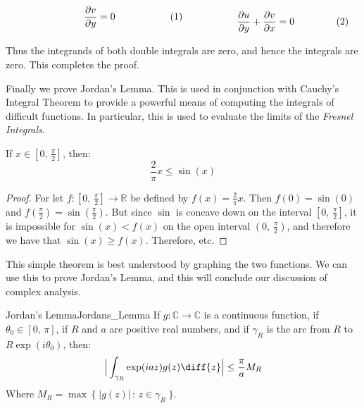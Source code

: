 \begin{bproof}
\begin{subequations}
\begin{minipage}{0.49\textwidth}
\begin{equation}
                    \frac{\partial{v}}{\partial{y}}=0
                \end{equation}
            \end{minipage}
            \hfill
            \begin{minipage}{0.49\textwidth}
                \centering
                \begin{equation}
                    \frac{\partial{u}}{\partial{y}}+
                    \frac{\partial{v}}{\partial{x}}=0
                \end{equation}
            \end{minipage}
        \end{subequations}
        \par\hfill\par
        Thus the integrands of both double integrals are zero,
        and hence the integrals are zero. This completes the proof.
    \end{bproof}
    Finally we prove Jordan's Lemma. This is used
    in conjunction with Cauchy's Integral Theorem to
    provide a powerful means of computing the integrals
    of difficult functions. In particular, this is used
    to evaluate the limits of the \textit{Fresnel Integrals}.
    \begin{theorem}
        \label{thm:Jordan_Inequality}%
        If $x\in[0,\,\frac{\pi}{2}]$, then:
        \begin{equation}
            \frac{2}{\pi}x\leq\sin(x)
        \end{equation}
    \end{theorem}
    \begin{proof}
        For let $f:[0,\,\frac{\pi}{2}]\rightarrow\mathbb{R}$ be defined
        by $f(x)=\frac{2}{\pi}x$. Then $f(0)=\sin(0)$ and
        $f(\frac{\pi}{2})=\sin(\frac{\pi}{2})$. But since
        $\sin$ is concave down on the interval $[0,\,\frac{\pi}{2}]$,
        it is impossible for $\sin(x)<f(x)$ on the open interval
        $(0,\,\frac{\pi}{2})$, and therefore we have that
        $\sin(x)\geq{f}(x)$. Therefore, etc.
    \end{proof}
    This simple theorem is best understood by graphing the two functions.
    We can use this to prove Jordan's Lemma, and this will conclude our
    discussion of complex analysis.
    \begin{ltheorem}{Jordan's Lemma}{Jordans_Lemma}
        If $g:\mathbb{C}\rightarrow\mathbb{C}$ is a continuous function,
        if $\theta_{0}\in[0,\,\pi]$, if $R$ and $a$ are positive
        real numbers, and if $\gamma_{R}$ is the arc from
        $R$ to $R\exp(i\theta_{0})$, then:
        \begin{equation}
            \Big|\int_{\gamma_{R}}\exp(iaz)g(z)\diff{z}\Big|
            \leq\frac{\pi}{a}M_{R}
        \end{equation}
        Where $M_{R}=\max\,\{\;|g(z)|\,:\,z\in\gamma_{R}\;\}$.
    \end{ltheorem}
